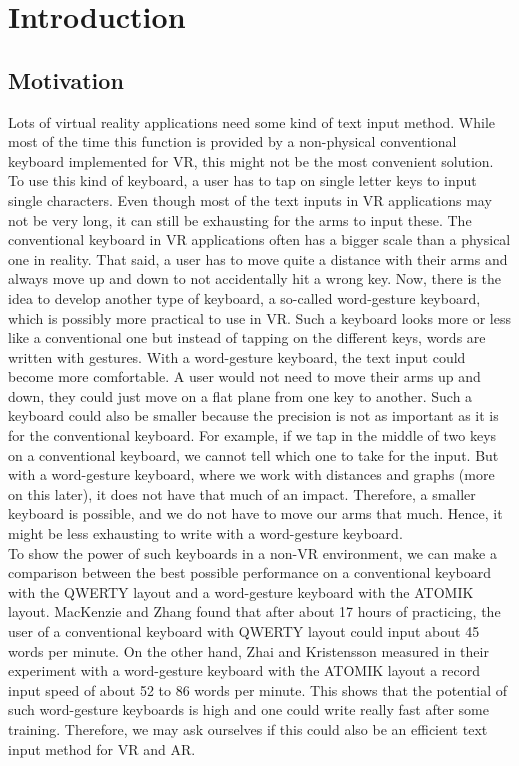 \chapter{Introduction}

\section{Motivation}
Lots of virtual reality applications need some kind of text input method. While most of the time this function is provided by a non-physical conventional keyboard implemented for VR, this might not be the most convenient solution. To use this kind of keyboard, a user has to tap on single letter keys to input single characters. Even though most of the text inputs in VR applications may not be very long, it can still be exhausting for the arms to input these. The conventional keyboard in VR applications often has a bigger scale than a physical one in reality. That said, a user has to move quite a distance with their arms and always move up and down to not accidentally hit a wrong key. Now, there is the idea to develop another type of keyboard, a so-called word-gesture keyboard, which is possibly more practical to use in VR. Such a keyboard looks more or less like a conventional one but instead of tapping on the different keys, words are written with gestures. With a word-gesture keyboard, the text input could become more comfortable. A user would not need to move their arms up and down, they could just move on a flat plane from one key to another. Such a keyboard could also be smaller because the precision is not as important as it is for the conventional keyboard. For example, if we tap in the middle of two keys on a conventional keyboard, we cannot tell which one to take for the input. But with a word-gesture keyboard, where we work with distances and graphs (more on this later), it does not have that much of an impact. Therefore, a smaller keyboard is possible, and we do not have to move our arms that much. Hence, it might be less exhausting to write with a word-gesture keyboard.\\
To show the power of such keyboards in a non-VR environment, we can make a comparison between the best possible performance on a conventional keyboard with the QWERTY layout and a word-gesture keyboard with the ATOMIK layout. MacKenzie and Zhang \cite{MacKenzie_Zhang_SoftKeyboard} found that after about 17 hours of practicing, the user of a conventional keyboard with QWERTY layout could input about 45 words per minute. On the other hand, Zhai and Kristensson \cite{Kristensson2004SHARK2AL} measured in their experiment with a word-gesture keyboard with the ATOMIK layout a record input speed of about 52 to 86 words per minute. This shows that the potential of such word-gesture keyboards is high and one could write really fast after some training. Therefore, we may ask ourselves if this could also be an efficient text input method for VR and AR.

